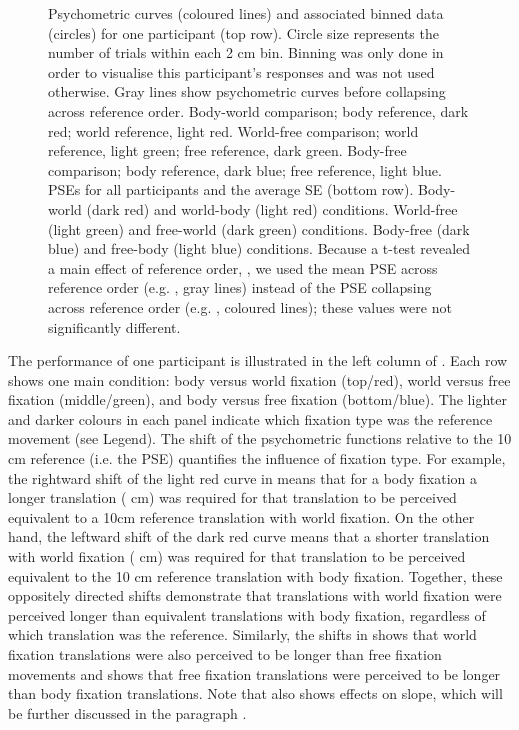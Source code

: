 \begin{figure}
    \caption{Psychometric curves (coloured lines) and associated binned data (circles) for one participant (top row). Circle size represents the number of trials within each 2 \si{\centi\metre} bin. Binning was only done in order to visualise this participant's responses and was not used otherwise. Gray lines show psychometric curves before collapsing across reference order.  Body-world comparison; body reference, dark red; world reference, light red.  World-free comparison; world reference, light green; free reference, dark green.   Body-free comparison; body reference, dark blue; free reference, light blue. \newline
PSEs for all participants and the average {\textpm}SE (bottom row).  Body-world (dark red) and world-body (light red) conditions.  World-free (light green) and free-world (dark green) conditions.  Body-free (dark blue) and free-body (light blue) conditions. Because a t-test revealed a main effect of reference order, , we used the mean PSE across reference order (e.g. , gray lines) instead of the PSE collapsing across reference order (e.g. , coloured lines); these values were not significantly different.}
    \label{p3:fig2}
\end{figure}

The performance of one participant is illustrated in the left column of . Each row shows one main condition: body versus world fixation (top/red), world versus free fixation (middle/green), and body versus free fixation (bottom/blue). The lighter and darker colours in each panel indicate which fixation type was the reference movement (see Legend). The shift of the psychometric functions relative to the 10 \si{\centi\metre} reference (i.e. the PSE) quantifies the influence of fixation type. For example, the rightward shift of the light red curve in  means that for a body fixation a longer translation ( \si{\centi\metre}) was required for that translation to be perceived equivalent to a 10\si{\centi\metre} reference translation with world fixation. On the other hand, the leftward shift of the dark red curve means that a shorter translation with world fixation ( \si{\centi\metre}) was required for that translation to be perceived equivalent to the 10 \si{\centi\metre} reference translation with body fixation. Together, these oppositely directed shifts demonstrate that translations with world fixation were perceived longer than equivalent translations with body fixation, regardless of which translation was the reference.  Similarly, the shifts in  shows that world fixation translations were also perceived to be longer than free fixation movements and  shows that free fixation translations were perceived to be longer than body fixation translations. Note that  also shows effects on slope, which will be further discussed in the paragraph .

